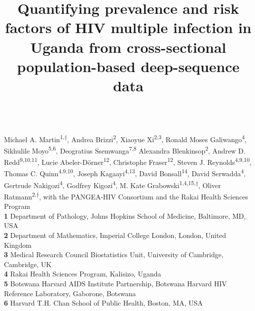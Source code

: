 \documentclass[10pt,letterpaper]{article}
\title{Quantifying prevalence and risk factors of HIV multiple infection in Uganda from cross-sectional population-based deep-sequence data}
\begin{document}

\begin{flushleft}

{\Large\textbf{} 
%
%
}
\newline
\\
Michael A. Martin\textsuperscript{1,$\dagger$},
Andrea Brizzi\textsuperscript{2},
Xiaoyue Xi\textsuperscript{2,3},
Ronald Moses Galiwango\textsuperscript{4},
Sikhulile Moyo\textsuperscript{5,6},
Deogratius Ssemwanga\textsuperscript{7,8}
Alexandra Blenkinsop\textsuperscript{2},
Andrew D. Redd\textsuperscript{9,10,11},
Lucie Abeler-Dörner\textsuperscript{12},
Christophe Fraser\textsuperscript{12},
Steven J. Reynolds\textsuperscript{4,9,10},
Thomas C. Quinn\textsuperscript{4,9,10},
Joseph Kagaayi\textsuperscript{4,13},
David Bonsall\textsuperscript{14},
David Serwadda\textsuperscript{4},
Gertrude Nakigozi\textsuperscript{4},
Godfrey Kigozi\textsuperscript{4},
M. Kate Grabowski\textsuperscript{1,4,15,$\dagger$},
Oliver Ratmann\textsuperscript{2,$\dagger$},
with the PANGEA-HIV Consortium and the Rakai Health Sciences Program
\\
\bigskip
\textbf{1} Department of Pathology, Johns Hopkins School of Medicine, Baltimore, MD, USA
\\
\textbf{2} Department of Mathematics, Imperial College London, London, United Kingdom
\\
\textbf{3} Medical Research Council Biostatistics Unit, University of Cambridge, Cambridge, UK \\

\textbf{4} Rakai Health Sciences Program, Kalisizo, Uganda \\

\textbf{5} Botswana Harvard AIDS Institute Partnership, Botswana Harvard HIV Reference Laboratory, Gaborone, Botswana \\

\textbf{6} Harvard T.H. Chan School of Public Health, Boston, MA, USA \\


\end{flushleft}
\end{document}
